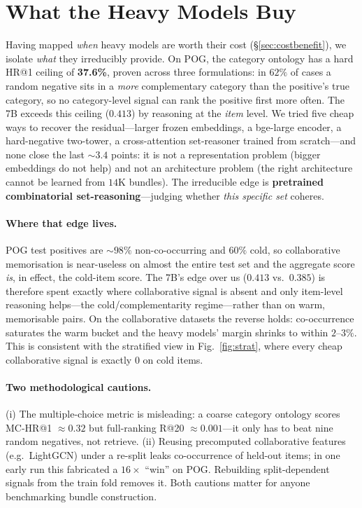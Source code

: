 \section{What the Heavy Models Buy}
\label{sec:diagnosis}
Having mapped \emph{when} heavy models are worth their cost (\S\ref{sec:costbenefit}), we isolate \emph{what}
they irreducibly provide. On POG, the category ontology has a hard HR@1 ceiling of \textbf{37.6\%}, proven
across three formulations: in $62\%$ of cases a random negative sits in a \emph{more} complementary category
than the positive's true category, so no category-level signal can rank the positive first more often. The
7B exceeds this ceiling ($0.413$) by reasoning at the \emph{item} level. We tried five cheap ways to recover
the residual---larger frozen embeddings, a bge-large encoder, a hard-negative two-tower, a cross-attention
set-reasoner trained from scratch---and none close the last ${\sim}3.4$ points: it is not a representation
problem (bigger embeddings do not help) and not an architecture problem (the right architecture cannot be
learned from $14$K bundles). The irreducible edge is \textbf{pretrained combinatorial set-reasoning}---judging
whether \emph{this specific set} coheres.

\paragraph{Where that edge lives.} POG test positives are ${\sim}98\%$ non-co-occurring and $60\%$ cold, so
collaborative memorisation is near-useless on almost the entire test set and the aggregate score \emph{is},
in effect, the cold-item score. The 7B's edge over us ($0.413$ vs.\ $0.385$) is therefore spent exactly
where collaborative signal is absent and only item-level reasoning helps---the cold/complementarity
regime---rather than on warm, memorisable pairs. On the collaborative datasets the reverse holds:
co-occurrence saturates the warm bucket and the heavy models' margin shrinks to within $2$--$3\%$. This is
consistent with the stratified view in Fig.~\ref{fig:strat}, where every cheap collaborative signal is
exactly $0$ on cold items.

\paragraph{Two methodological cautions.} (i) The multiple-choice metric is misleading: a coarse category
ontology scores MC-HR@1 $\approx 0.32$ but full-ranking R@20 $\approx 0.001$---it only has to beat nine
random negatives, not retrieve. (ii) Reusing precomputed collaborative features (e.g.\ LightGCN) under a
re-split leaks co-occurrence of held-out items; in one early run this fabricated a $16\times$ ``win'' on POG.
Rebuilding split-dependent signals from the train fold removes it. Both cautions matter for anyone
benchmarking bundle construction.
